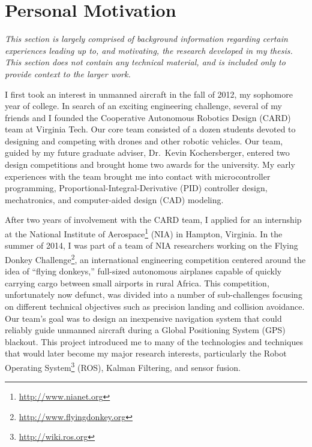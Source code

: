 \section{Personal Motivation}

\textit{This section is largely comprised of background information regarding certain experiences leading up to, and motivating, the research developed in my thesis. This section does not contain any technical material, and is included only to provide context to the larger work.}

I first took an interest in unmanned aircraft in the fall of 2012, my sophomore year of college. In search of an exciting engineering challenge, several of my friends and I founded the Cooperative Autonomous Robotics Design (CARD) team at Virginia Tech. Our core team consisted of a dozen students devoted to designing and competing with drones and other robotic vehicles. Our team, guided by my future graduate adviser, Dr.~Kevin Kochersberger, entered two design competitions and brought home two awards for the university. My early experiences with the team brought me into contact with microcontroller programming, Proportional-Integral-Derivative (PID) controller design, mechatronics, and computer-aided design (CAD) modeling.

After two years of involvement with the CARD team, I applied for an internship at the National Institute of Aerospace\footnote{\url{http://www.nianet.org}} (NIA) in Hampton, Virginia. In the summer of 2014, I was part of a team of NIA researchers working on the Flying Donkey Challenge\footnote{\url{http://www.flyingdonkey.org}}, an international engineering competition centered around the idea of ``flying donkeys,'' full-sized autonomous airplanes capable of quickly carrying cargo between small airports in rural Africa. This competition, unfortunately now defunct, was divided into a number of sub-challenges focusing on different technical objectives such as precision landing and collision avoidance. Our team's goal was to design an inexpensive navigation system that could reliably guide unmanned aircraft during a Global Positioning System (GPS) blackout. This project introduced me to many of the technologies and techniques that would later become my major research interests, particularly the Robot Operating System\footnote{\url{http://wiki.ros.org}} (ROS), Kalman Filtering, and sensor fusion.

